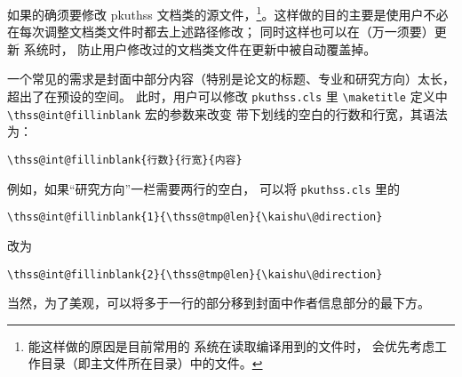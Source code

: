 如果的确须要修改 pkuthss 文档类的源文件，\footnote{%
	能这样做的原因是目前常用的  系统在读取编译用到的文件时，
	会优先考虑工作目录（即主文件所在目录）中的文件。%
}。这样做的目的主要是使用户不必在每次调整文档类文件时都去上述路径修改；
同时这样也可以在（万一须要）更新  系统时，
防止用户修改过的文档类文件在更新中被自动覆盖掉。

一个常见的需求是封面中部分内容（特别是论文的标题、专业和研究方向）太长，
超出了在预设的空间。
此时，用户可以修改 \verb|pkuthss.cls| 里 \verb|\maketitle| 定义中
\verb|\thss@int@fillinblank| 宏的参数来改变
带下划线的空白的行数和行宽，其语法为：
\begin{Verbatim}[frame = single]
\thss@int@fillinblank{行数}{行宽}{内容}
\end{Verbatim}
例如，如果“研究方向”一栏需要两行的空白，
可以将 \verb|pkuthss.cls| 里的
\begin{Verbatim}[frame = single]
\thss@int@fillinblank{1}{\thss@tmp@len}{\kaishu\@direction}
\end{Verbatim}
改为
\begin{Verbatim}[frame = single]
\thss@int@fillinblank{2}{\thss@tmp@len}{\kaishu\@direction}
\end{Verbatim}
当然，为了美观，可以将多于一行的部分移到封面中作者信息部分的最下方。

